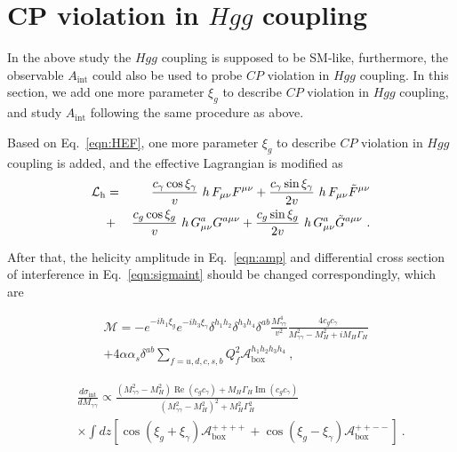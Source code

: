 \documentclass[twocolumn,
prd,amssymb,amsmath,preprintnumbers,
floatfix,aps,nofootinbib]{revtex4-1}
\newcommand{\bea}{\begin{eqnarray}}
\newcommand{\eea}{\end{eqnarray}}
\def\oRe{\operatorname{Re}}
\def\oIm{\operatorname{Im}}
\begin{document}
\section{CP violation in $Hgg$ coupling\label{section:hgg}}


In the above study the $Hgg$ coupling is supposed to be SM-like, furthermore,
the observable $A_{\text{int}}$ could also be used to probe $CP$ violation in $Hgg$ coupling.
In this section, we add one more parameter $\xi_g$ to describe $CP$ violation
in $Hgg$ coupling, and study $A_{\text{int}}$ following the same procedure as above.

Based on Eq.~\eqref{eqn:HEF}, one more parameter $\xi_g$ to describe $CP$ violation
in $Hgg$ coupling is added,
 and the effective Lagrangian is
modified as
\bea
        \mathcal{L}_{\rm h} &=&
\frac{c_\gamma \cos\xi_\gamma}{v}~h\,F_{\mu\nu} F^{\mu\nu} + \frac{c_\gamma \sin\xi_\gamma}{2v}~h\,F_{\mu\nu}\tilde{F}^{\mu\nu} \nonumber \\
&+& \frac{c_g \cos\xi_g}{v}~h\,G^a_{\mu\nu}G^{a\mu\nu} +
\frac{c_g \sin\xi_g}{2v}~h\,G^a_{\mu\nu}\tilde{G}^{a\mu\nu}~.
\label{eqn:HEFgg}
\eea

After that, the helicity amplitude in Eq.~\eqref{eqn:amp} and differential cross section
of interference in Eq.~\eqref{eqn:sigmaint} should be changed
correspondingly, which are

\bea
&\mathcal{M}
=
 -e^{-i h_1 \xi_g}e^{-i h_3\xi_\gamma}\delta^{h_1h_2}\delta^{h_3h_4}\delta^{a b}\frac{M^4_{\gamma\gamma}}{v^2}
\frac{4c_gc_\gamma}{M^2_{\gamma\gamma}-M^2_H+iM_H\Gamma_H}  \nonumber \\
&+ 4\alpha\alpha_s\delta^{a b}\sum_{f=u,d,c,s,b} Q^2_f
\mathcal{A}_{\text{box}}^{h_1 h_2 h_3h_4}~,
\label{eqn:ampgg}
\eea

\bea
&&\frac{d\sigma_{\text{int}}}{dM_{\gamma\gamma}}
\propto
\frac{(M^2_{\gamma\gamma}-M^2_H)\oRe\left(c_g c_\gamma \right)
+M_H\Gamma_H \oIm\left(c_g c_\gamma \right)
}
{(M^2_{\gamma\gamma}-M^2_H)^2+M^2_H\Gamma^2_H}
\nonumber\\
&&\times
\int dz[\cos(\xi_g+\xi_\gamma)\mathcal{A}_{\text{box}}^{++++}+\cos(\xi_g-\xi_\gamma)\mathcal{A}_{\text{box}}^{++--}]~.
\label{eqn:sigmaintgg}
\eea
\end{document}
